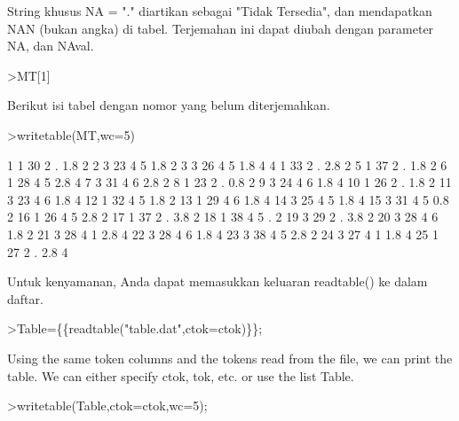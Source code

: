 \documentclass[a4paper,10pt]{article}
\begin{document}
\begin{eulernotebook}
\begin{eulercomment}
\begin{eulercomment}
\begin{eulercomment}
String khusus NA = "." diartikan sebagai "Tidak Tersedia", dan
mendapatkan NAN (bukan angka) di tabel. Terjemahan ini dapat diubah
dengan parameter NA, dan NAval.
\end{eulercomment}
\begin{eulerprompt}
>MT[1]
\end{eulerprompt}
\begin{euleroutput}
  [1,  1,  30,  2,  NAN,  1.8,  2]
\end{euleroutput}
\begin{eulercomment}
Berikut isi tabel dengan nomor yang belum diterjemahkan.
\end{eulercomment}
\begin{eulerprompt}
>writetable(MT,wc=5)
\end{eulerprompt}
\begin{euleroutput}
      1    1   30    2    .  1.8    2
      2    3   23    4    5  1.8    2
      3    3   26    4    5  1.8    4
      4    1   33    2    .  2.8    2
      5    1   37    2    .  1.8    2
      6    1   28    4    5  2.8    4
      7    3   31    4    6  2.8    2
      8    1   23    2    .  0.8    2
      9    3   24    4    6  1.8    4
     10    1   26    2    .  1.8    2
     11    3   23    4    6  1.8    4
     12    1   32    4    5  1.8    2
     13    1   29    4    6  1.8    4
     14    3   25    4    5  1.8    4
     15    3   31    4    5  0.8    2
     16    1   26    4    5  2.8    2
     17    1   37    2    .  3.8    2
     18    1   38    4    5    .    2
     19    3   29    2    .  3.8    2
     20    3   28    4    6  1.8    2
     21    3   28    4    1  2.8    4
     22    3   28    4    6  1.8    4
     23    3   38    4    5  2.8    2
     24    3   27    4    1  1.8    4
     25    1   27    2    .  2.8    4
\end{euleroutput}
\begin{eulercomment}
Untuk kenyamanan, Anda dapat memasukkan keluaran readtable() ke dalam
daftar.
\end{eulercomment}
\begin{eulerprompt}
>Table=\{\{readtable("table.dat",ctok=ctok)\}\};
\end{eulerprompt}
\begin{eulercomment}
Using the same token columns and the tokens read from the file, we can print the table. We can
either specify ctok, tok, etc. or use the list Table.
\end{eulercomment}
\begin{eulerprompt}
>writetable(Table,ctok=ctok,wc=5);

\end{eulerprompt}
\end{eulercomment}
\end{eulercomment}
\end{eulernotebook}
\end{document}
